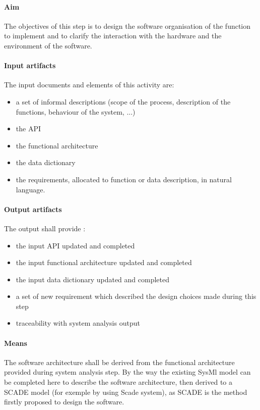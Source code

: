 \paragraph{Aim}
The objectives of this step is to design the software organisation of the function to implement and to clarify the interaction with the hardware and the environment of the software.


\paragraph{Input artifacts}

The input documents and elements of this activity are:
\begin{itemize}
\item a set of informal descriptions (scope of the process, description of the functions, behaviour of the system, ...)
\item the API
\item the functional architecture 
\item the data dictionary 
\item the requirements, allocated to function or data description, in natural language. 
\end{itemize}

\paragraph{Output artifacts}

The output shall provide :

\begin{itemize}
\item the input API updated and completed
\item the input functional architecture updated and completed
\item the input data dictionary updated and completed
\item a set of new requirement which described the design choices made during this step
\item traceability  with system analysis output
\end{itemize}

\paragraph{Means}

The software architecture shall be derived from the functional architecture provided during system analysis step. By the way the existing SysMl model can be completed here to describe the software architecture, then derived to a SCADE model (for exemple by using Scade system), as SCADE is the method firstly proposed to  design the software.

